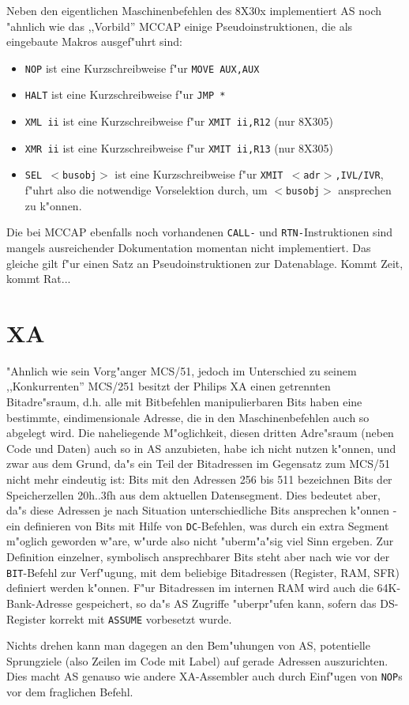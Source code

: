 \documentclass[12pt,a4paper,twoside]{report}
\newcommand{\tty}[1]{{\tt #1}}
\newcommand{\asname}{AS}
\begin{document}
Neben den eigentlichen Maschinenbefehlen des 8X30x implementiert \asname{}
noch "ahnlich wie das ,,Vorbild'' MCCAP einige Pseudoinstruktionen, die
als eingebaute Makros ausgef"uhrt sind:
\begin{itemize}
\item{\tty{NOP} ist eine Kurzschreibweise f"ur \tty{MOVE AUX,AUX}}
\item{\tty{HALT} ist eine Kurzschreibweise f"ur {\tt JMP \verb!*!}}
\item{\tty{XML ii} ist eine Kurzschreibweise f"ur \tty{XMIT ii,R12} (nur
      8X305)}
\item{\tty{XMR ii} ist eine Kurzschreibweise f"ur \tty{XMIT ii,R13} (nur
      8X305)}
\item{\tty{SEL $<$busobj$>$} ist eine Kurzschreibweise f"ur
      \tty{XMIT $<$adr$>$,IVL/IVR}, f"uhrt also die notwendige Vorselektion
      durch, um \tty{$<$busobj$>$} ansprechen zu k"onnen.}
\end{itemize}
Die bei MCCAP ebenfalls noch vorhandenen \tty{CALL-} und
\tty{RTN-}Instruktionen sind mangels ausreichender Dokumentation momentan
nicht implementiert. Das gleiche gilt f"ur einen Satz an
Pseudoinstruktionen zur Datenablage. Kommt Zeit, kommt Rat...


\section{XA}

"Ahnlich wie sein Vorg"anger MCS/51, jedoch im Unterschied zu seinem
,,Konkurrenten'' MCS/251 besitzt der Philips XA einen getrennten Bitadre"sraum,
d.h. alle mit Bitbefehlen manipulierbaren Bits haben eine
bestimmte, eindimensionale Adresse, die in den Maschinenbefehlen auch
so abgelegt wird.  Die naheliegende M"oglichkeit, diesen dritten
Adre"sraum (neben Code und Daten) auch so in \asname{} anzubieten, habe ich
nicht nutzen k"onnen, und zwar aus dem Grund, da"s ein Teil der Bitadressen
im Gegensatz zum MCS/51 nicht mehr eindeutig ist: Bits mit
den Adressen 256 bis 511 bezeichnen Bits der Speicherzellen 20h..3fh
aus dem aktuellen Datensegment.  Dies bedeutet aber, da"s diese Adressen
je nach Situation unterschiedliche Bits ansprechen k"onnen - ein definieren
von Bits mit Hilfe von \tty{DC}-Befehlen, was durch ein extra Segment
m"oglich geworden w"are, w"urde also nicht "uberm"a"sig viel Sinn ergeben.
Zur Definition einzelner, symbolisch ansprechbarer Bits steht aber
nach wie vor der \tty{BIT}-Befehl zur Verf"ugung, mit dem beliebige Bitadressen
(Register, RAM, SFR) definiert werden k"onnen.  F"ur Bitadressen im
internen RAM wird auch die 64K-Bank-Adresse gespeichert, so da"s \asname{}
Zugriffe "uberpr"ufen kann, sofern das DS-Register korrekt mit \tty{ASSUME}
vorbesetzt wurde.
\par
Nichts drehen kann man dagegen an den Bem"uhungen von \asname{}, potentielle
Sprungziele (also Zeilen im Code mit Label) auf gerade Adressen
auszurichten.  Dies macht \asname{} genauso wie andere XA-Assembler auch durch
Einf"ugen von \tty{NOP}s vor dem fraglichen Befehl.
\end{document}
